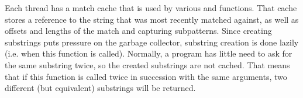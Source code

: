 \begin{capi}
\begin{capilist}
		Each thread has a match cache that is used by various
		 and  functions.  That cache
		stores a reference to the string that was most recently matched
		against, as well as offsets and lengths of the match and
		capturing subpatterns.  Since creating substrings puts pressure
		on the garbage collector, substring creation is done lazily
		(i.e. when this function is called).  Normally, a program has
		little need to ask for the same substring twice, so the created
		substrings are not cached.  That means that if this function is
		called twice in succession with the same arguments, two
		different (but equivalent) substrings will be returned.
	\end{capilist}
\end{capi}
